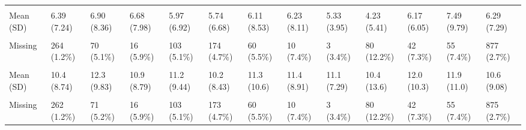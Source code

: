 \documentclass[
  single column]{article}
\begin{document}
\begin{landscape}
\begin{longtable}[t]{lllllllllllll}
\addlinespace
\cellcolor{gray!10}{Hours Exercising per Week} & \cellcolor{gray!10}{} & \cellcolor{gray!10}{} & \cellcolor{gray!10}{} & \cellcolor{gray!10}{} & \cellcolor{gray!10}{} & \cellcolor{gray!10}{} & \cellcolor{gray!10}{} & \cellcolor{gray!10}{} & \cellcolor{gray!10}{} & \cellcolor{gray!10}{} & \cellcolor{gray!10}{} & \cellcolor{gray!10}{}\\
Mean (SD) & 6.39 (7.24) & 6.90 (8.36) & 6.68 (7.98) & 5.97 (6.92) & 5.74 (6.68) & 6.11 (8.53) & 6.23 (8.11) & 5.33 (3.95) & 4.23 (5.41) & 6.17 (6.05) & 7.49 (9.79) & 6.29 (7.29)\\
\cellcolor{gray!10}{Median [Min, Max]} & \cellcolor{gray!10}{5.00 [0, 80.0]} & \cellcolor{gray!10}{5.00 [0, 80.0]} & \cellcolor{gray!10}{5.00 [0, 80.0]} & \cellcolor{gray!10}{5.00 [0, 80.0]} & \cellcolor{gray!10}{4.00 [0, 80.0]} & \cellcolor{gray!10}{4.00 [0, 80.0]} & \cellcolor{gray!10}{5.00 [0, 80.0]} & \cellcolor{gray!10}{5.00 [0, 16.0]} & \cellcolor{gray!10}{3.00 [0, 50.0]} & \cellcolor{gray!10}{5.00 [0, 36.0]} & \cellcolor{gray!10}{5.00 [0, 80.0]} & \cellcolor{gray!10}{5.00 [0, 80.0]}\\
Missing & 264 (1.2\%) & 70 (5.1\%) & 16 (5.9\%) & 103 (5.1\%) & 174 (4.7\%) & 60 (5.5\%) & 10 (7.4\%) & 3 (3.4\%) & 80 (12.2\%) & 42 (7.3\%) & 55 (7.4\%) & 877 (2.7\%)\\
\cellcolor{gray!10}{Hours of Housework per Week} & \cellcolor{gray!10}{} & \cellcolor{gray!10}{} & \cellcolor{gray!10}{} & \cellcolor{gray!10}{} & \cellcolor{gray!10}{} & \cellcolor{gray!10}{} & \cellcolor{gray!10}{} & \cellcolor{gray!10}{} & \cellcolor{gray!10}{} & \cellcolor{gray!10}{} & \cellcolor{gray!10}{} & \cellcolor{gray!10}{}\\
\addlinespace
Mean (SD) & 10.4 (8.74) & 12.3 (9.83) & 10.9 (8.79) & 11.2 (9.44) & 10.2 (8.43) & 11.3 (10.6) & 11.4 (8.91) & 11.1 (7.29) & 10.4 (13.6) & 12.0 (10.3) & 11.9 (11.0) & 10.6 (9.08)\\
\cellcolor{gray!10}{Median [Min, Max]} & \cellcolor{gray!10}{10.0 [0, 168]} & \cellcolor{gray!10}{10.0 [0, 105]} & \cellcolor{gray!10}{10.0 [0, 80.0]} & \cellcolor{gray!10}{10.0 [0, 130]} & \cellcolor{gray!10}{8.00 [0, 168]} & \cellcolor{gray!10}{10.0 [0, 168]} & \cellcolor{gray!10}{10.0 [0, 40.0]} & \cellcolor{gray!10}{10.0 [0, 40.0]} & \cellcolor{gray!10}{7.00 [0, 168]} & \cellcolor{gray!10}{10.0 [0, 100]} & \cellcolor{gray!10}{10.0 [0, 100]} & \cellcolor{gray!10}{10.0 [0, 168]}\\
Missing & 262 (1.2\%) & 71 (5.2\%) & 16 (5.9\%) & 103 (5.1\%) & 173 (4.7\%) & 60 (5.5\%) & 10 (7.4\%) & 3 (3.4\%) & 80 (12.2\%) & 42 (7.3\%) & 55 (7.4\%) & 875 (2.7\%)\\

\end{longtable}
\end{landscape}
\end{document}
